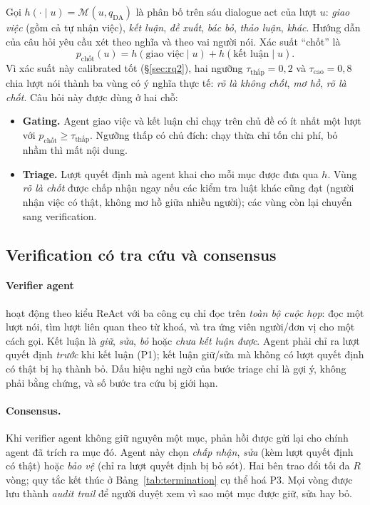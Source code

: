\documentclass[11pt]{article}
\newcommand{\pchot}{p_{\text{chốt}}}
\begin{document}
Gọi $h(\cdot\mid u)=\mathcal{M}(u,q_{\text{DA}})$ là phân bố trên sáu dialogue act của lượt $u$: \emph{giao
việc} (gồm cả tự nhận việc), \emph{kết luận}, \emph{đề xuất}, \emph{bác bỏ}, \emph{thảo luận}, \emph{khác}.
Hướng dẫn của câu hỏi yêu cầu xét theo nghĩa và theo vai người nói. Xác suất ``chốt'' là
\begin{equation}
\pchot(u)=h(\text{giao việc}\mid u)+h(\text{kết luận}\mid u).
\end{equation}
Vì xác suất này calibrated tốt (\S\ref{sec:rq2}), hai ngưỡng $\tau_{\text{thấp}}=0{,}2$ và
$\tau_{\text{cao}}=0{,}8$ chia lượt nói thành ba vùng có ý nghĩa thực tế: \emph{rõ là không chốt},
\emph{mơ hồ}, \emph{rõ là chốt}. Câu hỏi này được dùng ở hai chỗ:
\begin{itemize}
  \item \textbf{Gating.} Agent giao việc và kết luận chỉ chạy trên chủ đề có ít nhất một lượt
        với $\pchot\ge\tau_{\text{thấp}}$. Ngưỡng thấp có chủ đích: chạy thừa chỉ tốn chi phí, bỏ nhầm
        thì mất nội dung.
  \item \textbf{Triage.} Lượt quyết định mà agent khai cho mỗi mục được đưa qua $h$. Vùng
        \emph{rõ là chốt} được chấp nhận ngay nếu các kiểm tra luật khác cũng đạt (người nhận việc có
        thật, không mơ hồ giữa nhiều người); các vùng còn lại chuyển sang verification.
\end{itemize}

\subsection{Verification có tra cứu và consensus}
\label{sec:consensus}

\paragraph{Verifier agent} hoạt động theo kiểu ReAct \citep{yao2023react} với ba công cụ chỉ đọc trên
\emph{toàn bộ cuộc họp}: đọc một lượt nói, tìm lượt liên quan theo từ khoá, và tra ứng viên người/đơn vị
cho một cách gọi. Kết luận là \emph{giữ}, \emph{sửa}, \emph{bỏ} hoặc \emph{chưa kết luận được}. Agent
phải chỉ ra lượt quyết định \emph{trước} khi kết luận (P1); kết luận giữ/sửa mà không có lượt quyết định
có thật bị hạ thành bỏ. Dấu hiệu nghi ngờ của bước triage chỉ là gợi ý, không phải bằng chứng,
và số bước tra cứu bị giới hạn.

\paragraph{Consensus.} Khi verifier agent không giữ nguyên một mục, phản hồi được gửi lại cho chính
agent đã trích ra mục đó. Agent này chọn \emph{chấp nhận}, \emph{sửa} (kèm lượt quyết định có thật) hoặc
\emph{bảo vệ} (chỉ ra lượt quyết định bị bỏ sót). Hai bên trao đổi tối đa $R$ vòng; quy tắc kết thúc ở
Bảng~\ref{tab:termination} cụ thể hoá P3. Mọi vòng được lưu thành \emph{audit trail} để người duyệt
xem vì sao một mục được giữ, sửa hay bỏ.
\end{document}
